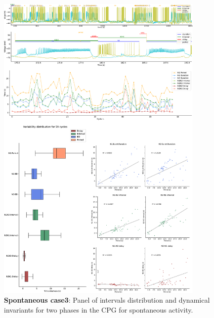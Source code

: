 \begin{figure}[htbp]
	\centering
	\includegraphics[width=0.9\textwidth]{./invariants/data/SUSSEX/prep3/images/2phases/panel_with_intervals.pdf}
	\caption{\textbf{Spontaneous case3}: Panel of intervals distribution and dynamical invariants for two phases in the CPG for spontaneous activity.}
	\label{fig:prep3 2phases invariants}
\end{figure}

